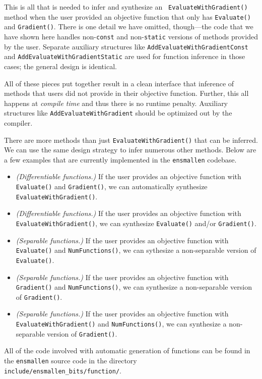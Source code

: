 This is all that is needed to infer and synthesize an {\tt
EvaluateWithGradient()} method when the user provided an objective function that
only has {\tt Evaluate()} and {\tt Gradient()}.  There is one detail we have
omitted, though---the code that we have shown here handles non-{\tt const}
and non-{\tt static} versions of methods provided by the user.  Separate
auxiliary structures like {\tt AddEvaluateWithGradientConst}
and {\tt AddEvaluateWithGradientStatic}
are used for function inference in those cases; the general design is identical.

All of these pieces put together result in a clean interface that inference of
methods that users did not provide in their objective function.  Further, this
all happens at {\it compile time} and thus there is no runtime penalty.
Auxiliary structures like {\tt AddEvaluateWithGradient} should be optimized out
by the compiler.

There are more methods than just {\tt EvaluateWithGradient()} that can be
inferred.  We can use the same design strategy to infer numerous other methods.
Below are a few examples that are currently implemented in the {\tt ensmallen}
codebase.

\begin{itemize}
  \item {\it (Differentiable functions.)}  If the user provides an objective
function with {\tt Evaluate()} and {\tt Gradient()}, we can automatically
synthesize {\tt EvaluateWithGradient()}.

  \item {\it (Differentiable functions.)}  If the user provides an objective
function with {\tt EvaluateWithGradient()}, we can synthesize {\tt Evaluate()}
and/or {\tt Gradient()}.

  \item {\it (Separable functions.)}  If the user provides an objective
function with {\tt Evaluate()} and {\tt NumFunctions()}, we can sythesize a
non-separable version of {\tt Evaluate()}.

  \item {\it (Separable functions.)}  If the user provides an objective function
with {\tt Gradient()} and {\tt NumFunctions()}, we can synthesize a
non-separable version of {\tt Gradient()}.

  \item {\it (Separable functions.)}  If the user provides an objective
function with {\tt EvaluateWithGradient()} and {\tt NumFunctions()}, we can
synthesize a non-separable version of {\tt Gradient()}.
\end{itemize}

All of the code involved with automatic generation of functions can be found in
the {\tt ensmallen} source code in the directory {\tt
include/ensmallen\_bits/function/}.
